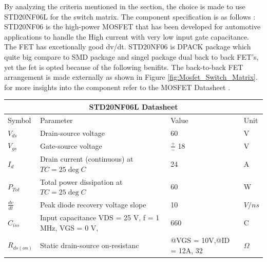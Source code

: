 \noindent By analyzing the criteria mentioned in the section, the choice is made to use STD20NF06L for the switch matrix. The component specification is as follows :
STD20NF06\cite{Switch_MatrixFET_STD20NF06L} is the high-power MOSFET that has been developed for automotive applications to handle the High current with very low input gate capacitance. The FET has excetionally good dv/dt. STD20NF06 is DPACK package which quite big compare to SMD package and singel package  dual back to back FET's, yet the fet is opted because of the following benifits. The back-to-back FET arrangement is made externally as shown in Figure \ref{fig:Mosfet_Switch_Matrix}.
for more insights into the component refer to the MOSFET Datasheet \cite{Switch_MatrixFET_STD20NF06L}.
	



\begin{tabular}{ |p{5cm}|p{5cm}|p{5cm}|p{5cm}|  }
\hline
\multicolumn{4}{|c|}{STD20NF06L Datasheet} \\
\hline
Symbol& Parameter &Value & Unit \\
\hline
$V_{ds}$  & Drain-source voltage & 60 & V \\
$V_{gs}$  & Gate-source voltage  & $\frac{+}{-}$ 18 & V \\
$I_{d}$   & Drain current (continuous) at $ TC = 25 \deg C$ & 24 & A \\
$P_{Tot}$ & Total power dissipation at $ TC = 25 \deg C$    & 60 & W \\
$\frac{dv}{dt}$ & Peak diode recovery voltage slope    & 10 & $V/ns$ \\
$C_{iss}$ & Input capacitance VDS = 25 V, f = 1 MHz, VGS = 0 V, & 660 & C \\
$R_{ds(on)}$ & Static drain-source on-resistanc & @VGS = 10V,@ID = 12A, 32  & $\Omega$ \\
\hline
\end{tabular}